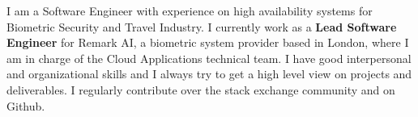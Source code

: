 

\begin{cvparagraph}

I am a Software Engineer with experience on high availability systems for Biometric Security and Travel Industry.
I currently work as a \textbf{Lead Software Engineer}  for Remark AI, a biometric system provider based in London, where I am
in charge of the Cloud Applications technical team.
I have good interpersonal and organizational skills and I always try to get a high level view on projects and deliverables.
I regularly contribute over the stack exchange community and on Github.
\end{cvparagraph}
